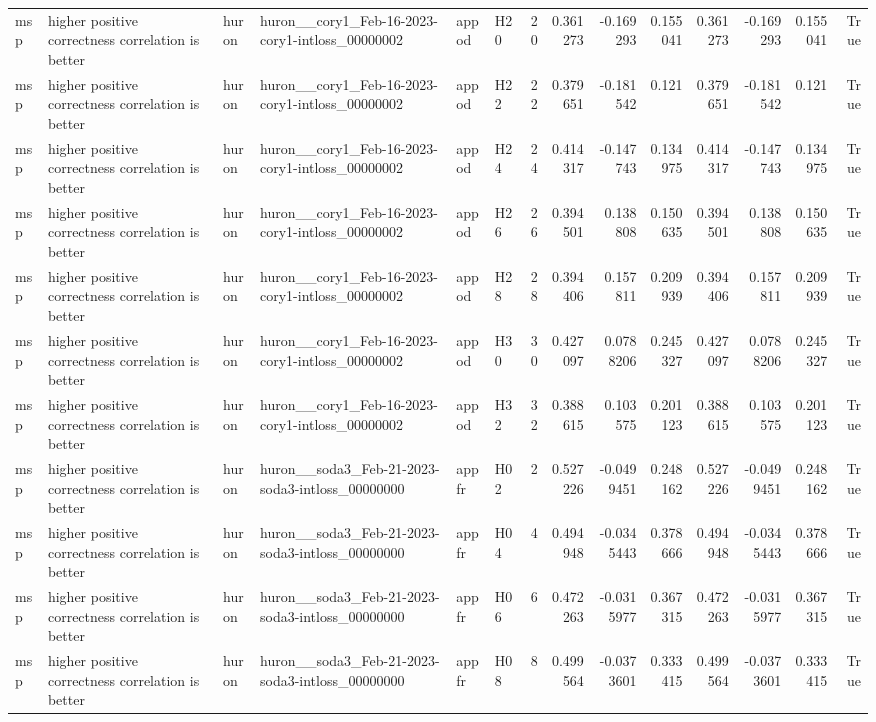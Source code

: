 \begin{longtable}{llllllrrrrrrrr}
msp & higher positive correctness correlation is better & huron & huron\_\_cory1\_Feb-16-2023-cory1-intloss\_00000002 & appod & H20 & 20 & 0.361273 & -0.169293 & 0.155041 & 0.361273 & -0.169293 & 0.155041 & True \\
msp & higher positive correctness correlation is better & huron & huron\_\_cory1\_Feb-16-2023-cory1-intloss\_00000002 & appod & H22 & 22 & 0.379651 & -0.181542 & 0.121 & 0.379651 & -0.181542 & 0.121 & True \\
msp & higher positive correctness correlation is better & huron & huron\_\_cory1\_Feb-16-2023-cory1-intloss\_00000002 & appod & H24 & 24 & 0.414317 & -0.147743 & 0.134975 & 0.414317 & -0.147743 & 0.134975 & True \\
msp & higher positive correctness correlation is better & huron & huron\_\_cory1\_Feb-16-2023-cory1-intloss\_00000002 & appod & H26 & 26 & 0.394501 & 0.138808 & 0.150635 & 0.394501 & 0.138808 & 0.150635 & True \\
msp & higher positive correctness correlation is better & huron & huron\_\_cory1\_Feb-16-2023-cory1-intloss\_00000002 & appod & H28 & 28 & 0.394406 & 0.157811 & 0.209939 & 0.394406 & 0.157811 & 0.209939 & True \\
msp & higher positive correctness correlation is better & huron & huron\_\_cory1\_Feb-16-2023-cory1-intloss\_00000002 & appod & H30 & 30 & 0.427097 & 0.0788206 & 0.245327 & 0.427097 & 0.0788206 & 0.245327 & True \\
msp & higher positive correctness correlation is better & huron & huron\_\_cory1\_Feb-16-2023-cory1-intloss\_00000002 & appod & H32 & 32 & 0.388615 & 0.103575 & 0.201123 & 0.388615 & 0.103575 & 0.201123 & True \\
msp & higher positive correctness correlation is better & huron & huron\_\_soda3\_Feb-21-2023-soda3-intloss\_00000000 & appfr & H02 & 2 & 0.527226 & -0.0499451 & 0.248162 & 0.527226 & -0.0499451 & 0.248162 & True \\
msp & higher positive correctness correlation is better & huron & huron\_\_soda3\_Feb-21-2023-soda3-intloss\_00000000 & appfr & H04 & 4 & 0.494948 & -0.0345443 & 0.378666 & 0.494948 & -0.0345443 & 0.378666 & True \\
msp & higher positive correctness correlation is better & huron & huron\_\_soda3\_Feb-21-2023-soda3-intloss\_00000000 & appfr & H06 & 6 & 0.472263 & -0.0315977 & 0.367315 & 0.472263 & -0.0315977 & 0.367315 & True \\
msp & higher positive correctness correlation is better & huron & huron\_\_soda3\_Feb-21-2023-soda3-intloss\_00000000 & appfr & H08 & 8 & 0.499564 & -0.0373601 & 0.333415 & 0.499564 & -0.0373601 & 0.333415 & True \\

\end{longtable}
